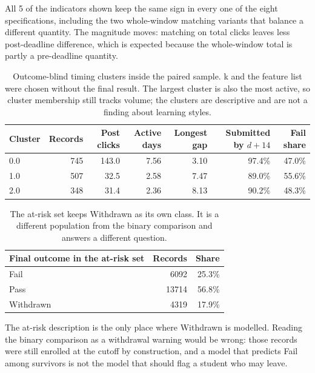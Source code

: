 \documentclass[11pt]{article}
\begin{document}
All 5 of the indicators shown keep the same sign in every one of the eight specifications, including the two whole-window matching variants that balance a different quantity. The magnitude moves: matching on total clicks leaves less post-deadline difference, which is expected because the whole-window total is partly a pre-deadline quantity.
\begin{table}[t]
\centering
\footnotesize
\begin{tabular}{lrrrrrr}
\toprule
Cluster & Records & Post clicks & Active days & Longest gap & Submitted by $d+14$ & Fail share \\
\midrule
0.0 & 745 & 143.0 & 7.56 & 3.10 & 97.4\% & 47.0\% \\
1.0 & 507 & 32.5 & 2.58 & 7.47 & 89.0\% & 55.6\% \\
2.0 & 348 & 31.4 & 2.36 & 8.13 & 90.2\% & 48.3\% \\
\bottomrule
\end{tabular}
\caption{Outcome-blind timing clusters inside the paired sample. k and the feature list were chosen without the final result. The largest cluster is also the most active, so cluster membership still tracks volume; the clusters are descriptive and are not a finding about learning styles.}
\label{tab:clusters}
\end{table}
\begin{table}[t]
\centering
\footnotesize
\begin{tabular}{lrr}
\toprule
Final outcome in the at-risk set & Records & Share \\
\midrule
Fail & 6092 & 25.3\% \\
Pass & 13714 & 56.8\% \\
Withdrawn & 4319 & 17.9\% \\
\bottomrule
\end{tabular}
\caption{The at-risk set keeps Withdrawn as its own class. It is a different population from the binary comparison and answers a different question.}
\label{tab:risk}
\end{table}
The at-risk description is the only place where Withdrawn is modelled. Reading the binary comparison as a withdrawal warning would be wrong: those records were still enrolled at the cutoff by construction, and a model that predicts Fail among survivors is not the model that should flag a student who may leave.
\end{document}
